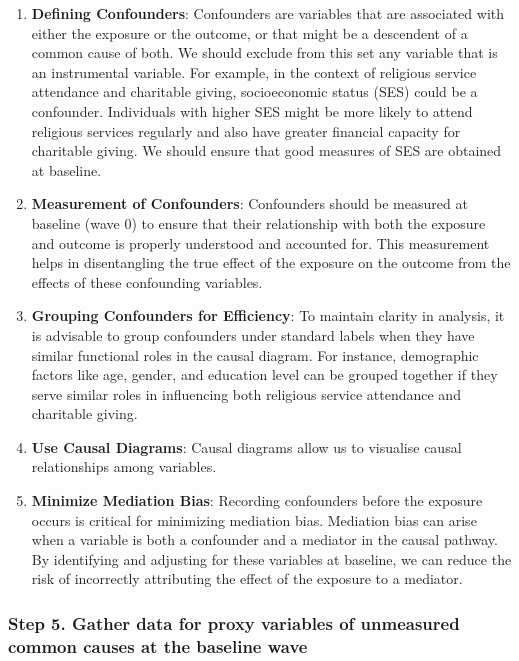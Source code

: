\documentclass[
  singlecolumn,
  9pt]{article}
\begin{document}
\begin{enumerate}
\def\labelenumi{\arabic{enumi}.}
\item
  \textbf{Defining Confounders}: Confounders are variables that are
  associated with either the exposure or the outcome, or that might be a
  descendent of a common cause of both. We should exclude from this set
  any variable that is an instrumental variable. For example, in the
  context of religious service attendance and charitable giving,
  socioeconomic status (SES) could be a confounder. Individuals with
  higher SES might be more likely to attend religious services regularly
  and also have greater financial capacity for charitable giving. We
  should ensure that good measures of SES are obtained at baseline.
\item
  \textbf{Measurement of Confounders}: Confounders should be measured at
  baseline (wave 0) to ensure that their relationship with both the
  exposure and outcome is properly understood and accounted for. This
  measurement helps in disentangling the true effect of the exposure on
  the outcome from the effects of these confounding variables.
\item
  \textbf{Grouping Confounders for Efficiency}: To maintain clarity in
  analysis, it is advisable to group confounders under standard labels
  when they have similar functional roles in the causal diagram. For
  instance, demographic factors like age, gender, and education level
  can be grouped together if they serve similar roles in influencing
  both religious service attendance and charitable giving.
\item
  \textbf{Use Causal Diagrams}: Causal diagrams allow us to visualise
  causal relationships among variables.
\item
  \textbf{Minimize Mediation Bias}: Recording confounders before the
  exposure occurs is critical for minimizing mediation bias. Mediation
  bias can arise when a variable is both a confounder and a mediator in
  the causal pathway. By identifying and adjusting for these variables
  at baseline, we can reduce the risk of incorrectly attributing the
  effect of the exposure to a mediator.
\end{enumerate}

\subsubsection{Step 5. Gather data for proxy variables of unmeasured
common causes at the baseline
wave}\label{step-5.-gather-data-for-proxy-variables-of-unmeasured-common-causes-at-the-baseline-wave}
\end{document}
